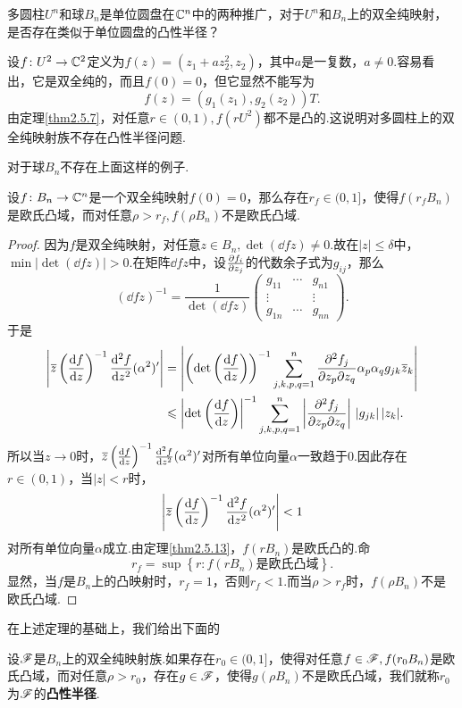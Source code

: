 多圆柱$U^n$和球$B_n$是单位圆盘在$\mathbb C^n$中的两种推广，对于$U^n$和$B_n$上的双全纯映射，是否存在类似于单位圆盘的凸性半径？

设$f\colon U^2\to\mathbb C^2$定义为$f(z)=(z_1+az_2^2,z_2)$，其中$a$是一复数，$a\neq0$.容易看出，它是双全纯的，而且$f(0)=0$，但它显然不能写为
\[f(z)=(g_1(z_1),g_2(z_2))T.\]
由定理\ref{thm2.5.7}，对任意$r\in(0,1),f(rU^2)$都不是凸的.这说明对多圆柱上的双全纯映射族不存在凸性半径问题.

对于球$B_n$不存在上面这样的例子.
\begin{theorem}\label{thm2.8.1}
	设$f\colon B_n\to\mathbb C^n$是一个双全纯映射$f(0)=0$，那么存在$r_f\in(0,1]$，使得$f(r_f B_n)$是欧氏凸域，而对任意$\rho>r_f,f(\rho B_n)$不是欧氏凸域.
\end{theorem}
\begin{proof}
	因为$f$是双全纯映射，对任意$z\in B_n,\det\left(\dd{f}{z}\right)\neq0$.故在$|z|\le\delta$中，\\
	$\min\left|\det\left(\dd{f}{z}\right)\right|>0$.在矩阵$\dd{f}{z}$中，设$\frac{\partial f_i}{\partial z_j}$的代数余子式为$g_{ij}$，那么
	\[\left(\dd{f}{z}\right)^{-1}=\frac1{\det\left(\dd{f}{z}\right)}\begin{pmatrix}
		g_{11} & \cdots & g_{n1}\\
		\vdots & & \vdots\\
		g_{1n} & \cdots & g_{nn}
	\end{pmatrix}.\]
于是
\begin{align*}
	\left|\bar{z}\left(\dd{f}{z}\right)^{-1}\ddd{f}{z}(\alpha^2)'\right|
	&=\left|\left(\det\left(\dd{f}{z}\right)\right)^{-1}\sum_{j,k,p,q=1}^{n}\pppp{f_j}{z_p}{z_q}\alpha_p\alpha_q g_{jk}\bar{z}_k\right|\\
	&\le\left|\det\left(\dd{f}{z}\right)\right|^{-1}\sum_{j,k,p,q=1}^{n}\left|\pppp{f_j}{z_p}{z_q}\right|\, |g_{jk}|\, |z_k|.
\end{align*}
所以当$z\to0$时，${}\mkern1mu\overline{\mkern-1muz}\left(\frac{\mathop{}\!\mathrm df}{\mathop{}\!\mathrm dz}\right)^{-1}\frac{\mathop{}\!\mathrm d^2f}{\mathop{}\!\mathrm dz^2}(\alpha^2)'$对所有单位向量$\alpha$一致趋于$0$.因此存在$r\in(0,1)$，当$|z|<r$时，
\[\left|{}\mkern1mu\overline{\mkern-1muz}\left(\frac{\mathop{}\!\mathrm df}{\mathop{}\!\mathrm dz}\right)^{-1}\frac{\mathop{}\!\mathrm d^2f}{\mathop{}\!\mathrm dz^2}(\alpha^2)'\right|<1\]
对所有单位向量$\alpha$成立.由定理\ref{thm2.5.13}，$f(rB_n)$是欧氏凸的.命
\[r_f=\sup\left\{r\colon f(rB_n)\text{是欧氏凸域}\right\}.\]
显然，当$f$是$B_n$上的凸映射时，$r_f=1$，否则$r_f<1$.而当$\rho>r_f$时，$f(\rho B_n)$不是欧氏凸域.
\end{proof}
在上述定理的基础上，我们给出下面的
\begin{definition}\label{def2.8.2}
	设$\mathscr F$是$B_n$上的双全纯映射族.如果存在$r_0\in(0,1]$，使得对任意$f\in\mathscr F,f(r_0 B_n)$是欧氏凸域，而对任意$\rho>r_0$，存在$g\in\mathscr F$，使得$g(\rho B_n)$不是欧氏凸域，我们就称$r_0$为$\mathscr F$的\textbf{凸性半径}.
\end{definition}

